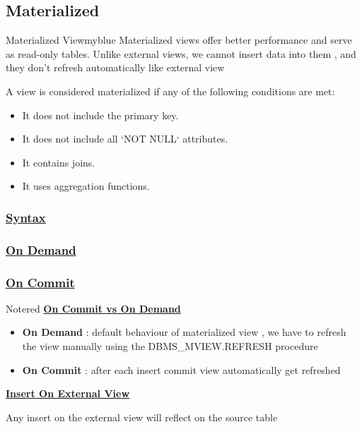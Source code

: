 

\subsection{Materialized}


\begin{prettyBox}{Materialized View}{myblue}
Materialized views offer better performance and serve as read-only tables. Unlike external views, we cannot insert data into them , and they don't
refresh automatically like external view

\vspace{0.15cm}
A view is considered materialized if any of the following conditions are met:  
\begin{itemize}
    \item It does not include the primary key.  
    \item It does not include all `NOT NULL` attributes.  
    \item It contains joins.  
    \item It uses aggregation functions.  
\end{itemize}
\end{prettyBox}

\subsubsection*{\underline{Syntax}}

\subsubsection*{\underline{On Demand}}



\subsubsection*{\underline{On Commit}} 


\begin{prettyBox}{Note}{red}
\textbf{\underline{On Commit vs On Demand}}
\begin{itemize}
    \item \textbf{On Demand} : default behaviour of materialized view , we have to refresh the view
manually using the DBMS\_MVIEW.REFRESH procedure
    \item \textbf{On Commit} : after each insert commit view automatically get refreshed
\end{itemize}

\vspace{0.15cm}
\textbf{\underline{Insert On External View}}

\vspace{0.15cm}
Any insert on the external view will reflect on the source table 
\end{prettyBox}

